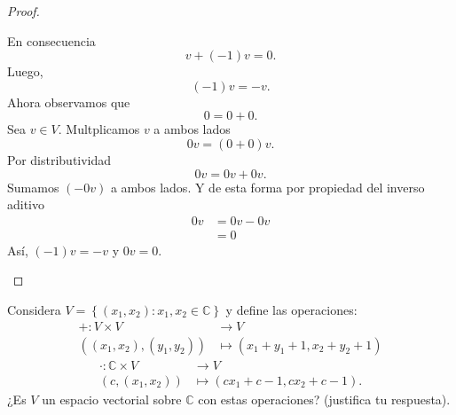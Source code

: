 \documentclass[12pt,a4paper]{article}
\begin{document}
\begin{proof}
\begin{enumerate}
            En consecuencia
            \begin{equation*}
                v+(-1)v=0.
            \end{equation*}
            Luego,
            \begin{equation*}
                (-1)v=-v.
            \end{equation*}
            Ahora observamos que
            \begin{equation*}
                0=0+0.
            \end{equation*}
            Sea $v\in V$. Multplicamos $v$ a ambos lados
            \begin{equation*}
                0v=(0+0)v.
            \end{equation*}
            Por distributividad
            \begin{equation*}
                0v=0v+0v.
            \end{equation*}
            Sumamos $(-0v)$ a ambos lados. Y de esta forma por propiedad del inverso aditivo
            \begin{align*}
                0v&=0v-0v\\
                &=0
            \end{align*}
            Así, $(-1)v=-v$ y $0v=0$.
        \end{enumerate}
    \end{proof}

    \begin{mdframed}[style=mdbluebox,frametitle={Ejercicio 2}]
        Considera $V=\left\{(x_{1},x_{2}):x_{1},x_{2}\in\mathbb{C}\right\}$ y define las operaciones:
        \begin{align*}
            +:V\times V&\to V\\
            \left((x_{1},x_{2}),(y_{1},y_{2})\right)&\mapsto(x_{1}+y_{1}+1,x_{2}+y_{2}+1)
        \end{align*}
        \begin{align*}
            \cdot :\mathbb{C}\times V&\to V\\
            \left(c,(x_{1},x_{2})\right)&\mapsto(cx_{1}+c-1,cx_{2}+c-1).
        \end{align*}
        ¿Es $V$ un espacio vectorial sobre $\mathbb{C}$ con estas operaciones? (justifica tu respuesta).
    \end{mdframed}
\end{document}
